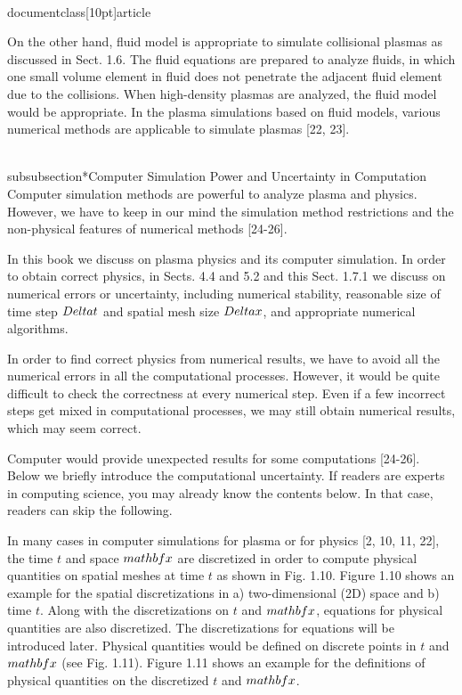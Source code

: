 \\documentclass[10pt]{article}
\begin{document}
On the other hand, fluid model is appropriate to simulate collisional plasmas as discussed in Sect. 1.6. The fluid equations are prepared to analyze fluids, in which one small volume element in fluid does not penetrate the adjacent fluid element due to the collisions. When high-density plasmas are analyzed, the fluid model would be appropriate. In the plasma simulations based on fluid models, various numerical methods are applicable to simulate plasmas [22, 23].

\\subsubsection*{Computer Simulation Power and Uncertainty in Computation}
Computer simulation methods are powerful to analyze plasma and physics. However, we have to keep in our mind the simulation method restrictions and the non-physical features of numerical methods [24-26].

In this book we discuss on plasma physics and its computer simulation. In order to obtain correct physics, in Sects. 4.4 and 5.2 and this Sect. 1.7.1 we discuss on numerical errors or uncertainty, including numerical stability, reasonable size of time step $\\Delta t$ and spatial mesh size $\\Delta x$, and appropriate numerical algorithms.

In order to find correct physics from numerical results, we have to avoid all the numerical errors in all the computational processes. However, it would be quite difficult to check the correctness at every numerical step. Even if a few incorrect steps get mixed in computational processes, we may still obtain numerical results, which may seem correct.

Computer would provide unexpected results for some computations [24-26]. Below we briefly introduce the computational uncertainty. If readers are experts in computing science, you may already know the contents below. In that case, readers can skip the following.

In many cases in computer simulations for plasma or for physics [2, 10, 11, 22], the time $t$ and space $\\mathbf{x}$ are discretized in order to compute physical quantities on spatial meshes at time $t$ as shown in Fig. 1.10. Figure 1.10 shows an example for the spatial discretizations in a) two-dimensional (2D) space and b) time $t$. Along with the discretizations on $t$ and $\\mathbf{x}$, equations for physical quantities are also discretized. The discretizations for equations will be introduced later. Physical quantities would be defined on discrete points in $t$ and $\\mathbf{x}$ (see Fig. 1.11). Figure 1.11 shows an example for the definitions of physical quantities on the discretized $t$ and $\\mathbf{x}$.
\end{document}
